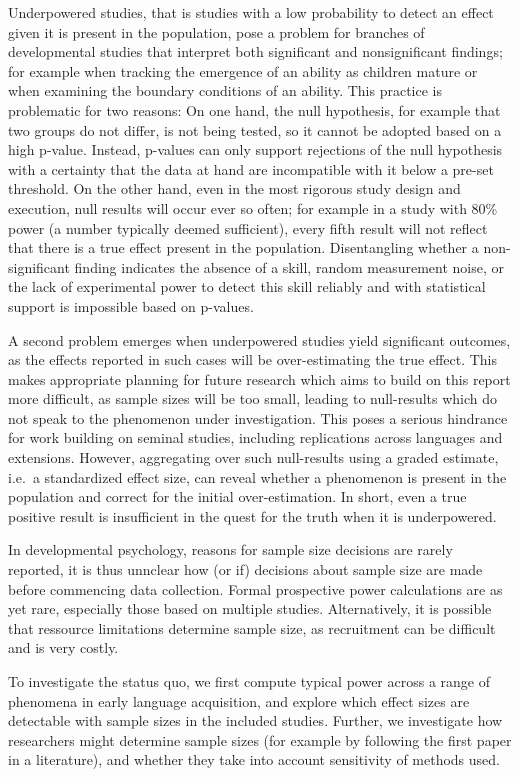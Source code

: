 \documentclass[english,floatsintext,man]{apa6}
\begin{document}
Underpowered studies, that is studies with a low probability to detect
an effect given it is present in the population, pose a problem for
branches of developmental studies that interpret both significant and
nonsignificant findings; for example when tracking the emergence of an
ability as children mature or when examining the boundary conditions of
an ability. This practice is problematic for two reasons: On one hand,
the null hypothesis, for example that two groups do not differ, is not
being tested, so it cannot be adopted based on a high p-value. Instead,
p-values can only support rejections of the null hypothesis with a
certainty that the data at hand are incompatible with it below a pre-set
threshold. On the other hand, even in the most rigorous study design and
execution, null results will occur ever so often; for example in a study
with 80\% power (a number typically deemed sufficient), every fifth
result will not reflect that there is a true effect present in the
population. Disentangling whether a non-significant finding indicates
the absence of a skill, random measurement noise, or the lack of
experimental power to detect this skill reliably and with statistical
support is impossible based on p-values.

A second problem emerges when underpowered studies yield significant
outcomes, as the effects reported in such cases will be over-estimating
the true effect. This makes appropriate planning for future research
which aims to build on this report more difficult, as sample sizes will
be too small, leading to null-results which do not speak to the
phenomenon under investigation. This poses a serious hindrance for work
building on seminal studies, including replications across languages and
extensions. However, aggregating over such null-results using a graded
estimate, i.e.~a standardized effect size, can reveal whether a
phenomenon is present in the population and correct for the initial
over-estimation. In short, even a true positive result is insufficient
in the quest for the truth when it is underpowered.

In developmental psychology, reasons for sample size decisions are
rarely reported, it is thus unnclear how (or if) decisions about sample
size are made before commencing data collection. Formal prospective
power calculations are as yet rare, especially those based on multiple
studies. Alternatively, it is possible that ressource limitations
determine sample size, as recruitment can be difficult and is very
costly.

To investigate the status quo, we first compute typical power across a
range of phenomena in early language acquisition, and explore which
effect sizes are detectable with sample sizes in the included studies.
Further, we investigate how researchers might determine sample sizes
(for example by following the first paper in a literature), and whether
they take into account sensitivity of methods used.
\end{document}
